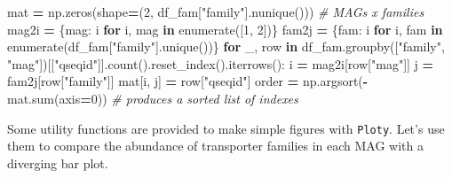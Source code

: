 \documentclass[
]{book}
\newenvironment{Shaded}{\begin{snugshade}}{\end{snugshade}}
\newcommand{\BuiltInTok}[1]{#1}
\newcommand{\CommentTok}[1]{\textcolor[rgb]{0.56,0.35,0.01}{\textit{#1}}}
\newcommand{\ControlFlowTok}[1]{\textcolor[rgb]{0.13,0.29,0.53}{\textbf{#1}}}
\newcommand{\DecValTok}[1]{\textcolor[rgb]{0.00,0.00,0.81}{#1}}
\newcommand{\KeywordTok}[1]{\textcolor[rgb]{0.13,0.29,0.53}{\textbf{#1}}}
\newcommand{\NormalTok}[1]{#1}
\newcommand{\OperatorTok}[1]{\textcolor[rgb]{0.81,0.36,0.00}{\textbf{#1}}}
\newcommand{\StringTok}[1]{\textcolor[rgb]{0.31,0.60,0.02}{#1}}
\begin{document}
\begin{Shaded}
\begin{Highlighting}[numbers=left,,]
\NormalTok{mat }\OperatorTok{=}\NormalTok{ np.zeros(shape}\OperatorTok{=}\NormalTok{(}\DecValTok{2}\NormalTok{, df\_fam[}\StringTok{"family"}\NormalTok{].nunique())) }\CommentTok{\# MAGs x families}
\NormalTok{mag2i }\OperatorTok{=}\NormalTok{ \{mag: i }\ControlFlowTok{for}\NormalTok{ i, mag }\KeywordTok{in} \BuiltInTok{enumerate}\NormalTok{([}\DecValTok{1}\NormalTok{, }\DecValTok{2}\NormalTok{])\}}
\NormalTok{fam2j }\OperatorTok{=}\NormalTok{ \{fam: i }\ControlFlowTok{for}\NormalTok{ i, fam }\KeywordTok{in} \BuiltInTok{enumerate}\NormalTok{(df\_fam[}\StringTok{"family"}\NormalTok{].unique())\}}
\ControlFlowTok{for}\NormalTok{ \_, row }\KeywordTok{in}\NormalTok{ df\_fam.groupby([}\StringTok{"family"}\NormalTok{, }\StringTok{"mag"}\NormalTok{])[[}\StringTok{"qseqid"}\NormalTok{]].count().reset\_index().iterrows():}
\NormalTok{    i }\OperatorTok{=}\NormalTok{ mag2i[row[}\StringTok{"mag"}\NormalTok{]]}
\NormalTok{    j }\OperatorTok{=}\NormalTok{ fam2j[row[}\StringTok{"family"}\NormalTok{]]}
\NormalTok{    mat[i, j] }\OperatorTok{=}\NormalTok{ row[}\StringTok{"qseqid"}\NormalTok{]}
\NormalTok{order }\OperatorTok{=}\NormalTok{ np.argsort(}\OperatorTok{{-}}\NormalTok{mat.}\BuiltInTok{sum}\NormalTok{(axis}\OperatorTok{=}\DecValTok{0}\NormalTok{)) }\CommentTok{\# produces a sorted list of indexes}
\end{Highlighting}
\end{Shaded}

Some utility functions are provided to make simple figures with \texttt{Ploty}.
Let's use them to compare the abundance of transporter families in each MAG with a diverging bar plot.
\end{document}
